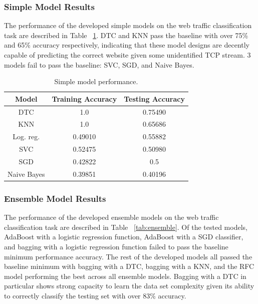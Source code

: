\documentclass[10pt,sigconf,letterpaper,nonacm]{acmart}
\begin{document}
\subsubsection{Simple Model Results}

The performance of the developed simple models on the web traffic classification task are described in Table ~\ref{tab:simple}.
DTC and KNN pass the baseline with over 75\% and 65\% accuracy respectively, indicating that these model designs are decently capable of predicting the correct website given some unidentified TCP stream.
3 models fail to pass the baseline: SVC, SGD, and Naive Bayes.

\begin{table}[h]
  \caption{Simple model performance.}
  \label{tab:simple}
  \begin{tabular}{ccc}
    \toprule
    Model & Training Accuracy & Testing Accuracy \\
    \midrule
    DTC & 1.0 & 0.75490 \\
    KNN & 1.0 & 0.65686 \\
    Log. reg. & 0.49010 & 0.55882 \\
    SVC & 0.52475 & 0.50980 \\
    SGD & 0.42822 & 0.5 \\
    Naive Bayes & 0.39851 & 0.40196 \\
    \bottomrule
  \end{tabular}
\end{table}

\subsubsection{Ensemble Model Results}

The performance of the developed ensemble models on the web traffic classification task are described in Table ~\ref{tab:ensemble}.
Of the tested models, AdaBoost with a logistic regression function, AdaBoost with a SGD classifier, and bagging with a logistic regression function failed to pass the baseline minimum performance accuracy.
The rest of the developed models all passed the baseline minimum with bagging with a DTC, bagging with a KNN, and the RFC model performing the best across all ensemble models.
Bagging with a DTC in particular shows strong capacity to learn the data set complexity given its ability to correctly classify the testing set with over 83\% accuracy. 
\end{document}
